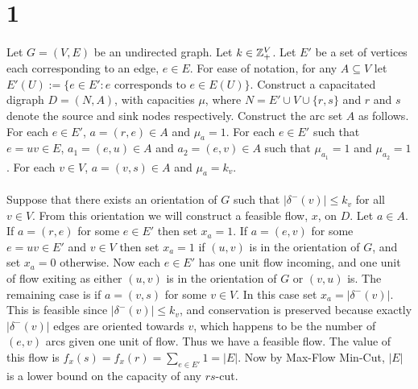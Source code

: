 \documentclass[letterpaper,12pt,oneside,onecolumn]{article}
\begin{document}
\section*{1}
\paragraph{}
Let $G=(V,E)$ be an undirected graph. Let $k \in \mathbb{Z}_+^V$. Let $E'$ be a set of vertices each corresponding to an edge, $e\in E$. For ease of notation, for any $A \subseteq V$ let $E'(U) := \{e \in E' : e \text{ corresponds to } e \in E(U) \}$. Construct a capacitated digraph $D=(N,A)$, with capacities $\mu$, where $N = E' \cup V \cup \{r,s\}$ and $r$ and $s$ denote the source and sink nodes respectively. Construct the arc set $A$ as follows. For each $e \in E'$, $a = (r,e) \in A$ and $\mu_a = 1$. For each $e \in E'$ such that $e=uv \in E$, $a_1 = (e,u) \in A$ and $a_2 = (e,v) \in A$ such that $\mu_{a_1} = 1$ and $\mu_{a_2} = 1$. For each $v \in V$, $a = (v,s) \in A$ and $\mu_a = k_v$.
\paragraph{}
Suppose that there exists an orientation of $G$ such that $|\delta^-(v)|\leq k_v$ for all $v \in V$. From this orientation we will construct a feasible flow, $x$, on $D$. Let $a\in A$. If $a = (r,e)$ for some $e \in E'$ then set $x_a = 1$. If $a = (e,v)$ for some $e=uv \in E'$ and $v \in V$ then set $x_a = 1$ if $(u,v)$ is in the orientation of $G$, and set $x_a = 0$ otherwise. Now each $e \in E'$ has one unit flow incoming, and one unit of flow exiting as either $(u,v)$ is in the orientation of $G$ or $(v,u)$ is. The remaining case is if $a = (v,s)$ for some $v \in V$. In this case set $x_a = |\delta^-(v)|$. This is feasible since $|\delta^-(v)|\leq k_v$, and conservation is preserved because exactly $|\delta^-(v)|$ edges are oriented towards $v$, which happens to be the number of $(e,v)$ arcs given one unit of flow. Thus we have a feasible flow. The value of this flow is $f_x(s) = f_x(r) = \sum_{e\in E'} 1 = |E|$. Now by Max-Flow Min-Cut, $|E|$ is a lower bound on the capacity of any $rs$-cut.
\end{document}
